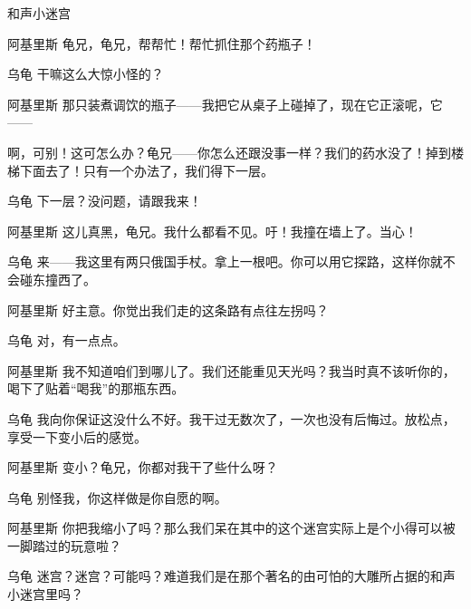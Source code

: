 \begin{dialog}{和声小迷宫}
\begin{dialogue}
\begin{dialogue}
\begin{dialogue}
    \item[阿基里斯]龟兄，龟兄，帮帮忙！帮忙抓住那个药瓶子！

    \item[乌龟]干嘛这么大惊小怪的？

    \item[阿基里斯]那只装煮调饮的瓶子——我把它从桌子上碰掉了，现在它正滚呢，它——


    啊，可别！这可怎么办？龟兄——你怎么还跟没事一样？我们的药水没了！掉到楼梯下面去了！只有一个办法了，我们得下一层。

    \item[乌龟]下一层？没问题，请跟我来！


    \begin{dialogue}
      \item[阿基里斯]这儿真黑，龟兄。我什么都看不见。吁！我撞在墙上了。当心！

      \item[乌龟]来——我这里有两只俄国手杖。拿上一根吧。你可以用它探路，这样你就不会碰东撞西了。

      \item[阿基里斯]好主意。你觉出我们走的这条路有点往左拐吗？

      \item[乌龟]对，有一点点。

      \item[阿基里斯]我不知道咱们到哪儿了。我们还能重见天光吗？我当时真不该听你的，喝下了贴着“喝我”的那瓶东西。

      \item[乌龟]我向你保证这没什么不好。我干过无数次了，一次也没有后悔过。放松点，享受一下变小后的感觉。

      \item[阿基里斯]变小？龟兄，你都对我干了些什么呀？

      \item[乌龟]别怪我，你这样做是你自愿的啊。

      \item[阿基里斯]你把我缩小了吗？那么我们呆在其中的这个迷宫实际上是个小得可以被一脚踏过的玩意啦？

      \item[乌龟]迷宫？迷宫？可能吗？难道我们是在那个著名的由可怕的大雕所占据的和声小迷宫里吗？


\end{dialogue}
\end{dialogue}
\end{dialogue}
\end{dialogue}
\end{dialog}
